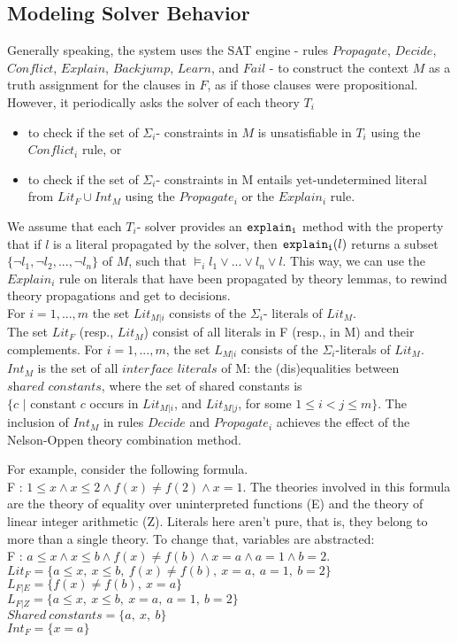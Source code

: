 \documentclass{article}
\begin{document}
\subsection{Modeling Solver Behavior}
Generally speaking, the system uses the SAT engine - rules $Propagate$, 
$Decide$, $Conflict$, $Explain$, $Backjump$, $Learn$, and $Fail$ - to 
construct the context $M$ as a truth assignment for the clauses in $F$, 
as if those clauses were propositional. However, it periodically asks 
the solver of each theory $T_i$
\begin{itemize}
	\item to check if the set of $\Sigma_i$- constraints in $M$ is 
	unsatisfiable in $T_i$ using the $Conflict_i$ rule, or
	\item to check if the set of $\Sigma_i$- constraints in M entails
	yet-undetermined literal from $Lit_F \cup Int_M$ using the 
	$Propagate_i$ or the $Explain_i$ rule.
\end{itemize}
We assume that each $T_i$- solver provides an ${\tt explain_i}$ method
with the property that if $l$ is a literal propagated by the solver, 
then ${\tt explain_i}(l)$ returns a subset $\{\neg l_1, \neg l_2, 
..., \neg l_n\}$ of $M$, such that $\models_i l_1 \lor 
... \lor l_n \lor l$. This way, we can use the $Explain_i$ rule on
literals that have been propagated by theory lemmas, to rewind 
theory propagations and get to decisions.\\
For $i = 1,...,m$ the set $Lit_{M|i}$ consists of the $\Sigma_i$- 
literals of $Lit_M$. \\

The set $Lit_F$ (resp., $Lit_M$) consist of all literals in F 
(resp., in M) and their complements. For $i = 1,...,m$, the 
set $L_{M|i}$ consists of the $\Sigma_i$-literals of $Lit_M$.
$Int_M$ is the set of all $\textit{interface literals}$ of M: 
the (dis)equalities between $\textit{shared constants}$, where
the set of shared constants is  \\ $\{c$ $|$ constant $c$ occurs in 
$Lit_{M|i}$, and $Lit_{M|j}$, for some $1 \leq i < j \leq m\}$.
The inclusion of $Int_M$ in rules $Decide$ and $Propagate_i$ 
achieves the effect of the Nelson-Oppen theory combination method.

For example, consider the following formula. \\
F : $1 \leq x \land x \leq 2 \land f(x) \neq f(2) \land x = 1$.
The theories involved in this formula are the theory of equality
over uninterpreted functions (E) and the theory of linear integer
arithmetic (Z). Literals here aren't pure, that is, they belong to 
more than a single theory. To change that, variables are abstracted: \\
F : $a \leq x \land x \leq b \land f(x) \neq f(b) \land x = a 
\land a = 1 \land b = 2$. \\
$Lit_F = \{a \leq x ,\ x \leq b ,\ f(x) \neq f(b) ,\ x = a 
,\ a = 1 ,\ b = 2\}$ \\
$L_{F|E} = \{f(x) \neq f(b),\ x = a\}$ \\
$L_{F|Z} = \{a \leq x ,\ x \leq b ,\ x = a,\ a = 1 ,\ b = 2\}$\\
$Shared\ constants = \{a,\ x,\ b\}$\\
$Int_F = \{x = a\}$\\
\end{document}
